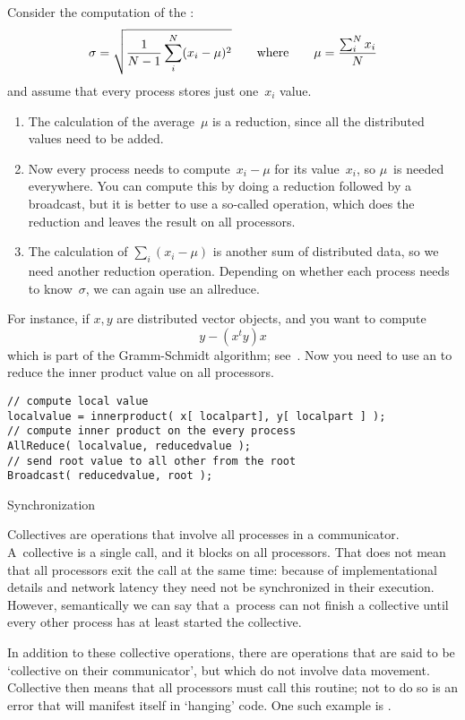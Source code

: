 Consider the computation of the :
\[ \sigma = \sqrt{\frac1{N-1} \sum_i^N (x_i-\mu)^2 }
\qquad\hbox{where}\qquad \mu = \frac{\sum_i^Nx_i}N
\]
and assume that every process stores just one~$x_i$ value.
\begin{enumerate}
\item The calculation of the average~$\mu$ is a reduction, since all
  the distributed values need to be added.
\item Now every
  process needs to compute~$x_i-\mu$ for its value~$x_i$, so $\mu$~is
  needed everywhere. You can compute this by doing a reduction followed
  by a broadcast, but it is better to use a so-called
   operation, which does the reduction and leaves
  the result on all processors.
\item The calculation of $\sum_i(x_i-\mu)$ is another sum of
  distributed data, so we need another reduction operation. Depending
  on whether each process needs to know~$\sigma$, we can again use an
  allreduce.
\end{enumerate}

For instance, if $x,y$ are distributed vector objects, and you want to compute
\[ y- (x^ty)x \]
which is part of the Gramm-Schmidt algorithm; see~.
Now you need to use an  to reduce the inner product value on all processors. 
\begin{lstlisting}
// compute local value
localvalue = innerproduct( x[ localpart], y[ localpart ] );
// compute inner product on the every process
AllReduce( localvalue, reducedvalue );
// send root value to all other from the root
Broadcast( reducedvalue, root );
\end{lstlisting}

 {Synchronization}

Collectives are operations that involve all processes in a
communicator. %
A~collective is a
single call, and it blocks on all processors.
That does not mean that
all processors exit the call at the same time: because of
implementational details and network
latency they need not be synchronized in their execution.
However, semantically we can say that
a~process can not finish
a collective until every other process has at least started the collective.

In addition to these collective operations, there are operations that
are said to be `collective on their communicator', but which do not
involve data movement. Collective then means that all processors must
call this routine; not to do so is an error that will 
manifest itself in `hanging' code. One such example is
.


